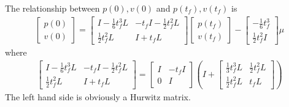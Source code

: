\documentclass[letterpaper, 10 pt, conference,onecolumn]{ieeeconf}  %
\begin{document}
The relationship between $p(0),v(0)$ and $p(t_f),v(t_f)$ is
\begin{align*}
\begin{bmatrix}
p(0)\\
v(0)
\end{bmatrix}=\begin{bmatrix}
I-\frac{1}{6}t_f^3L&-t_fI-\frac{1}{2}t_f^2L\\
\frac{1}{2}t_f^2L&I+t_fL
\end{bmatrix}
\begin{bmatrix}
p(t_f)\\
v(t_f)
\end{bmatrix}-\begin{bmatrix}
-\frac{1}{6}t_f^3\\ \frac{1}{2}t_f^2I 
\end{bmatrix}\mu
\end{align*}
where
\begin{align*}
\begin{bmatrix}
I-\frac{1}{6}t_f^3L&-t_fI-\frac{1}{2}t_f^2L\\
\frac{1}{2}t_f^2L&I+t_fL
\end{bmatrix}=\begin{bmatrix}
I&-t_fI\\
0&I
\end{bmatrix}\left(I+\begin{bmatrix}
\frac{1}{3}t_f^3L&\frac{1}{2}t_f^2L\\
\frac{1}{2}t_f^2L&t_fL
\end{bmatrix}\right)
\end{align*}
The left hand side is obviously a Hurwitz matrix.
\end{document}
